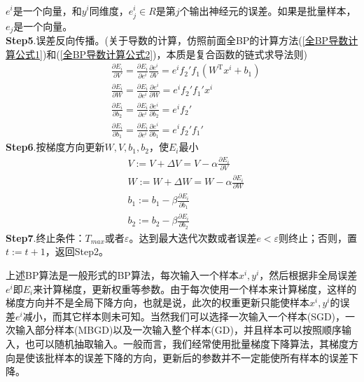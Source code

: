 {\begin{align*}
            \end{align*}
            $e^i$是一个向量，和$y^i$同维度，$e_j^i\in R$是第$j$个输出神经元的误差。如果是批量样本，$e_j$是一个向量。\\
            \textbf{Step5}.误差反向传播。(关于导数的计算，仿照前面全BP的计算方法(\ref{全BP导数计算公式1})和(\ref{全BP导数计算公式2})，本质是复合函数的链式求导法则)
            \begin{align*}
            & \frac{\partial E_i}{\partial V} = \frac{\partial E_i}{\partial e^i}\frac{\partial e^i}{\partial V} = e^i f_2' f_1 (W^\mathrm{T}x^i+b_1) \\
            & \frac{\partial E_i}{\partial W }= \frac{\partial E_i}{\partial e^i}\frac{\partial e^i}{\partial W} = e^i f_2'f_1'x^i    \\
            & \frac{\partial E_i}{\partial b_2} = \frac{\partial E_i}{\partial e^i}\frac{\partial e^i}{\partial b_2} = e^i f_2' \\
            & \frac{\partial E_i}{\partial b_1} = \frac{\partial E_i}{\partial e^i}\frac{\partial e^i}{\partial b_1} = e^if_2'f_1'
            \end{align*}
            \textbf{Step6}.按梯度方向更新$W,V,b_1,b_2$，使$E_i$最小
            \begin{align*}
            & V :=V+\Delta V = V -\alpha \frac{\partial E_i}{\partial V}\\
            & W:=W + \Delta W = W - \alpha \frac{\partial E_i}{\partial W}\\
            & b_1:=b_1 -\beta \frac{\partial E_i}{\partial b_1}\\
            & b_2:=b_2 - \beta \frac{\partial E_i}{\partial b_2}
            \end{align*}
            \textbf{Step7}.终止条件：$T_{max}$或者$\varepsilon$。达到最大迭代次数或者误差$e<\varepsilon$则终止；否则，置$t:=t+1$，返回Step2。
            \par
            上述BP算法是一般形式的BP算法，每次输入一个样本$x^i,y^i$，然后根据非全局误差$e^i$即$E_i$来计算梯度，更新权重等参数。由于每次使用一个样本来计算梯度，这样的梯度方向并不是全局下降方向，也就是说，此次的权重更新只能使样本$x^i,y^i$的误差$e^i$减小，而其它样本则未可知。当然我们可以选择一次输入一个样本(SGD)，一次输入部分样本(MBGD)以及一次输入整个样本(GD)，并且样本可以按照顺序输入，也可以随机抽取输入。一般而言，我们经常使用批量梯度下降算法，其梯度方向是使该批样本的误差下降的方向，更新后的参数并不一定能使所有样本的误差下降。
}

